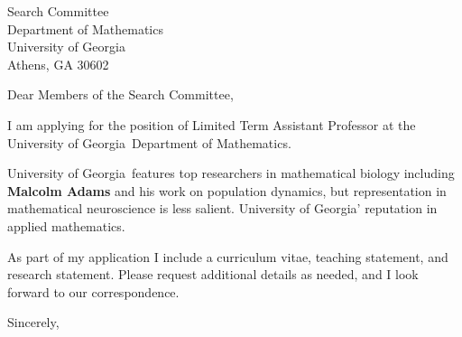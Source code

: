 \documentclass[11pt,a4paper]{letter}
\begin{document}

\def\School{University of Georgia}

\begin{letter}
{Search Committee\\
Department of Mathematics\\
University of Georgia\\
Athens, GA 30602}


\opening{Dear Members of the Search Committee,}

I am applying for the position of Limited Term Assistant Professor at the \School~Department of Mathematics. 



\School~features top researchers in mathematical biology including \textbf{Malcolm Adams} and his work on population dynamics, but representation in mathematical neuroscience is less salient. \School' reputation in applied mathematics.



As part of my application I include a curriculum vitae, teaching statement, and research statement. Please request additional details as needed, and I look forward to our correspondence.

\closing{Sincerely,}
\end{letter}
\end{document}

